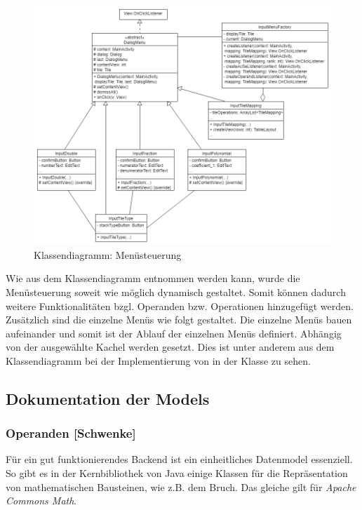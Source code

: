 \begin{figure}[h]
	\includegraphics[width=\columnwidth]{img/klassendiagramm_Menusteuerung}
	\caption[Klassendiagramm: Menüsteuerung]{Klassendiagramm: Menüsteuerung\footnotemark}
\end{figure}
\FloatBarrier

Wie aus dem Klassendiagramm entnommen werden kann, wurde die Menüsteuerung soweit wie möglich dynamisch gestaltet. Somit können dadurch weitere Funktionalitäten bzgl. Operanden bzw. Operationen hinzugefügt werden.  Zusätzlich sind die einzelne Menüs wie folgt gestaltet. Die einzelne Menüs bauen aufeinander und somit ist der Ablauf der einzelnen Menüs definiert. Abhängig von der ausgewählte Kachel werden  gesetzt. Dies ist unter anderem aus dem Klassendiagramm bei der Implementierung von  in der Klasse  zu sehen. 
\clearpage

\subsection{Dokumentation der Models}

\subsubsection{Operanden [Schwenke]}

Für ein gut funktionierendes Backend ist ein einheitliches Datenmodel essenziell. So gibt es in der Kernbibliothek von Java einige Klassen für die Repräsentation von mathematischen Bausteinen, wie z.B. dem Bruch. Das gleiche gilt für \textit{Apache Commons Math}. 

